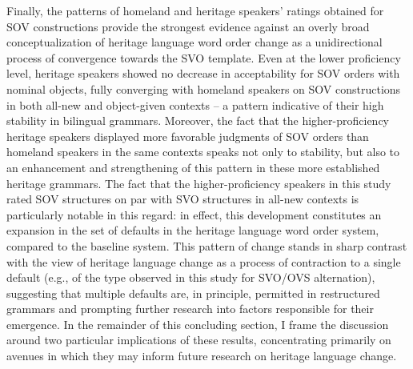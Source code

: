 \documentclass[output=paper]{langscibook}
\begin{document}
Finally, the patterns of homeland and heritage speakers’ ratings obtained for SOV constructions provide the strongest evidence against an overly broad conceptualization of heritage language word order change as a unidirectional process of convergence towards the SVO template. Even at the lower proficiency level, heritage speakers showed no decrease in acceptability for SOV orders with nominal objects, fully converging with homeland speakers on SOV constructions in both all-new and object-given contexts – a pattern indicative of their high stability in bilingual grammars. Moreover, the fact that the higher-proficiency heritage speakers displayed more favorable judgments of SOV orders than homeland speakers in the same contexts speaks not only to stability, but also to an enhancement and strengthening of this pattern in these more established heritage grammars. The fact that the higher-proficiency speakers in this study rated SOV structures on par with SVO structures in all-new contexts is particularly notable in this regard: in effect, this development constitutes an expansion in the set of defaults in the heritage language word order system, compared to the baseline system. This pattern of change stands in sharp contrast with the view of heritage language change as a process of contraction to a single default (e.g., of the type observed in this study for SVO/OVS alternation), suggesting that multiple defaults are, in principle, permitted in restructured grammars and prompting further research into factors responsible for their emergence. In the remainder of this concluding section, I frame the discussion around two particular implications of these results, concentrating primarily on avenues in which they may inform future research on heritage language change.
\end{document}
